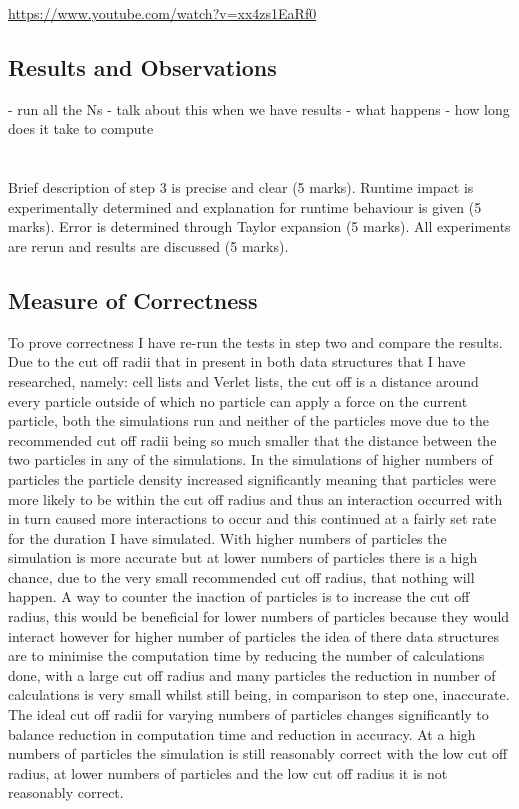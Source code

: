 \documentclass[paper=a4, fontsize=11pt]{scrartcl}
\numberwithin{equation}{section}		%
\numberwithin{figure}{section}			%
\numberwithin{table}{section}				%
\begin{document}
\url{https://www.youtube.com/watch?v=xx4zs1EaRf0}

\subsection{Results and Observations}

- run all the Ns
- talk about this when we have results
- what happens
- how long does it take to compute

\section{}

Brief description of step 3 is precise
and clear (5 marks). Runtime impact is
experimentally determined and
explanation for runtime behaviour is
given (5 marks). Error is determined
through Taylor expansion (5 marks). All
experiments are rerun and results are
discussed (5 marks).

\subsection{Measure of Correctness}

To prove correctness I have re-run the tests in step two and compare the results. Due to the cut off radii that in present in both data structures that I have researched, namely: cell lists and Verlet lists, the cut off is a distance around every particle outside of which no particle can apply a force on the current particle, both the simulations run and neither of the particles move due to the recommended cut off radii being so much smaller that the distance between the two particles in any of the simulations. In the simulations of higher numbers of particles the particle density increased significantly meaning that particles were more likely to be within the cut off radius and thus an interaction occurred with in turn caused more interactions to occur and this continued at a fairly set rate for the duration I have simulated. With higher numbers of particles the simulation is more accurate but at lower numbers of particles there is a high chance, due to the very small recommended cut off radius, that nothing will happen. A way to counter the inaction of particles is to increase the cut off radius, this would be beneficial for lower numbers of particles because they would interact however for higher number of particles the idea of there data structures are to minimise the computation time by reducing the number of calculations done, with a large cut off radius and many particles the reduction in number of calculations is very small whilst still being, in comparison to step one, inaccurate. The ideal cut off radii for varying numbers of particles changes significantly to balance reduction in computation time and reduction in accuracy. At a high numbers of particles the simulation is still reasonably correct with the low cut off radius, at lower numbers of particles and the low cut off radius it is not reasonably correct. 
\end{document}
